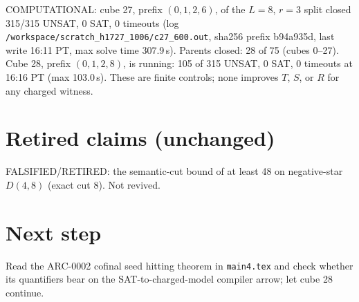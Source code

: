 \documentclass[11pt]{article}
\begin{document}
COMPUTATIONAL: cube 27, prefix $(0,1,2,6)$, of the $L=8$, $r=3$ split closed 315/315 UNSAT, 0 SAT, 0 timeouts (log \texttt{/workspace/scratch\_h1727\_1006/c27\_600.out}, sha256 prefix b94a935d, last write 16:11 PT, max solve time 307.9\,s). Parents closed: 28 of 75 (cubes 0--27). Cube 28, prefix $(0,1,2,8)$, is running: 105 of 315 UNSAT, 0 SAT, 0 timeouts at 16:16 PT (max 103.0\,s). These are finite controls; none improves $T$, $S$, or $R$ for any charged witness.

\section*{Retired claims (unchanged)}
FALSIFIED/RETIRED: the semantic-cut bound of at least 48 on negative-star $D(4,8)$ (exact cut 8). Not revived.

\section*{Next step}
Read the ARC-0002 cofinal seed hitting theorem in \texttt{main4.tex} and check whether its quantifiers bear on the SAT-to-charged-model compiler arrow; let cube 28 continue.
\end{document}

